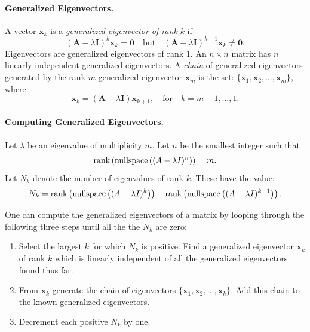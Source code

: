 \paragraph{Generalized Eigenvectors.}
A vector $\mathbf{x}_k$ is a \textit{generalized eigenvector of rank} $k$ if
\[
(\mathbf{A} - \lambda \mathbf{I})^k \mathbf{x}_k = \mathbf{0} \quad \mathrm{but} \quad
(\mathbf{A} - \lambda \mathbf{I})^{k-1} \mathbf{x}_{k} \neq \mathbf{0}.
\]
Eigenvectors are generalized eigenvectors of rank 1.
An $n \times n$ matrix has $n$ linearly independent generalized eigenvectors.
A \textit{chain} of generalized eigenvectors generated by the rank $m$ 
generalized eigenvector $\mathbf{x}_m$ is the set:
$\{ \mathbf{x}_1, \mathbf{x}_2, \ldots, \mathbf{x}_m \}$,
where 
\[
\mathbf{x}_k = (\mathbf{A} - \lambda \mathbf{I}) \mathbf{x}_{k+1}, \quad \mathrm{for} \quad
k = m-1, \ldots, 1.
\]


\paragraph{Computing Generalized Eigenvectors.}

Let $\lambda$ be an eigenvalue of multiplicity $m$.  Let $n$ be the smallest
integer such that
\[
\mathop{\mathrm{rank}}\nolimits \left( \mathop{\mathrm{nullspace}}\nolimits \left( (A - \lambda I)^n \right) \right) = m.
\]
Let $N_k$ denote the number of eigenvalues of rank $k$.  These 
have the value:
\[
N_k = \mathop{\mathrm{rank}}\nolimits \left( \mathop{\mathrm{nullspace}}\nolimits \left( (A - \lambda I)^k \right) \right)
- \mathop{\mathrm{rank}}\nolimits \left( \mathop{\mathrm{nullspace}}\nolimits \left( (A - \lambda I)^{k-1} \right) \right).
\]

One can compute the generalized eigenvectors of a matrix by looping 
through the following three steps until all the the $N_k$ are zero:
\begin{enumerate}
\item Select the largest $k$ for which $N_k$ is positive.  Find a 
  generalized eigenvector $\mathbf{x}_k$ of rank $k$ which is linearly independent 
  of all the generalized eigenvectors found thus far.  
\item From $\mathbf{x}_k$ generate the 
  chain of eigenvectors $\{\mathbf{x}_1, \mathbf{x}_2, \ldots, \mathbf{x}_k\}$.  Add this 
  chain to the known generalized eigenvectors.
\item
  Decrement each positive $N_k$ by one.
\end{enumerate}


